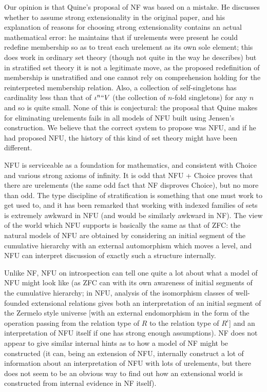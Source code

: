 \documentclass{article}
\theoremstyle{definition}
\theoremstyle{remark}
\begin{document}
{Our opinion is that Quine's proposal of NF was based on a mistake.  He discusses whether to assume strong extensionality in the original paper, and his explanation of reasons for choosing strong extensionality contains an actual mathematical error:  he maintains that if urelements were present he could redefine membership so as to treat each urelement as its own sole element;  this does work in ordinary set theory (though not quite in the way he describes) but in stratified set theory it is not a legitimate move, as the proposed redefinition of membership is unstratified and one cannot rely on comprehension holding for the reinterpreted membership relation.  Also, a collection of self-singletons
has cardinality less than that of $\iota^n``V$ (the collection of $n$-fold singletons) for any $n$ and so is quite small.  None of this is conjectural:  the proposal that Quine makes for eliminating urelements fails in all models of NFU built using Jensen's construction.
We believe that the correct system to propose was NFU, and if he had proposed NFU, the history of this kind of set theory might have been different.

NFU is serviceable as a foundation for mathematics, and consistent with Choice and various strong axioms of infinity.  It is odd that NFU + Choice proves that there are urelements (the same odd fact that NF disproves Choice), but no more than odd.
The type discipline of stratification is something that one must work to get used to, and it has been remarked that working with indexed families of sets is extremely awkward in NFU (and would be similarly awkward in NF).  The view of the world which NFU supports is basically the same as that of ZFC:  the natural models of NFU are obtained by considering an initial segment of the cumulative hierarchy with an external automorphism which moves a level, and NFU can interpret discussion of exactly such a structure internally.

Unlike NF, NFU on introspection can tell one quite a lot about what a model of NFU might look like (as ZFC can with its own awareness of initial segments of the cumulative hierarchy; in NFU, analysis of the isomorphism classes of well-founded extensional relations gives both an interpretation of an initial segment of the Zermelo style universe [with an external endomorphism in the form of the operation passing from the relation type of $R$ to the relation type of $R^{\iota}$]  and an interpretation of NFU itself if one has strong enough assumptions).    NF does not appear to give similar internal hints as to how a model of NF might be constructed  (it can, being an extension of NFU, internally construct a lot of information about an interpretation of NFU with lots of urelements, but there does not seem to be an obvious way to find out how an extensional world is constructed from internal evidence in NF itself).

}
\end{document}
